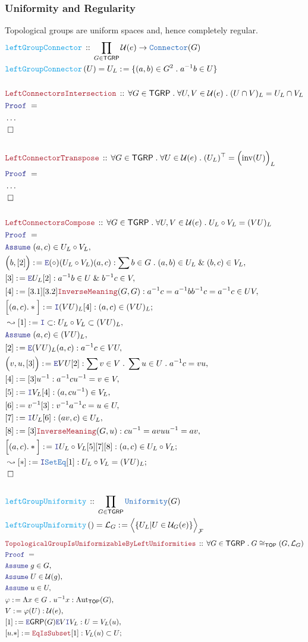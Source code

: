 \documentclass[12pt]{scrartcl}
\newcommand{\TYPE}[1]{\textcolor{NavyBlue}{\mathtt{#1}}}
\newcommand{\FUNC}[1]{\textcolor{Cerulean}{\mathtt{#1}}}
\newcommand{\LOGIC}[1]{\textcolor{Blue}{\mathtt{#1}}}
\newcommand{\THM}[1]{\textcolor{Maroon}{\mathtt{#1}}}
\renewcommand{\.}{\; . \;}
\newcommand{\de}{: \kern 0.1pc =}
\newcommand{\Act}[1]{\left( #1 \right)}
\newcommand{\Theorem}[2]{& \THM{#1} \, :: \, #2 \\ & \Proof = \\ }
\newcommand{\DeclareFunc}[2]{& \FUNC{#1} \, :: \, #2 \\}
\newcommand{\DefineNamedFunc}[4]{&  \FUNC{#1}\Act{#2} = #3 \de #4 \\}
\newcommand{\Page}[1]{ \begin{align*} #1 \end{align*}   }
\newcommand{\NoProof}{ & \ldots \\ \EndProof}
\renewcommand{\And}{\; \& \;}
\newcommand{\Aut}{\mathrm{Aut}}
\newcommand{\Say}[3]{& #1 \de #2 : #3, \\}
\newcommand{\Conclude}[3]{& #1 \de #2 : #3; \\}
\newcommand{\Derive}[3]{& \leadsto #1 \de #2 : #3, \\}
\newcommand{\DeriveConclude}[3]{& \leadsto #1 \de #2 : #3 ; \\}
\newcommand{\AssumeIn}[2]{& \LOGIC{Assume} \; #1 \in #2, \\}
\newcommand{\Intro}{\LOGIC{I}}
\newcommand{\Elim}{\LOGIC{E}}
\newcommand{\QED}{\; \square}
\newcommand{\EndProof}{& \QED \\}
\newcommand{\Proof}{\LOGIC{Proof} \; }
\newcommand{\TOP}{\mathsf{TOP}}
\renewcommand{\U}{\mathcal{U}}
\newcommand{\F}{\mathcal{F}}
\renewcommand{\L}{\mathcal{L}}
\newcommand{\GRP}{\mathsf{GRP}}
\newcommand{\Connector}{\TYPE{Connector}}
\newcommand{\Unif}{\TYPE{Uniformity}}
\newcommand{\inv}{\mathrm{inv}}
\newcommand{\TGRP}{\mathsf{TGRP}}
\renewcommand{\L}{\mathcal{L}}
\begin{document}
\subsubsection{Uniformity and Regularity}
Topological groups are uniform spaces and, hence completely regular.
\Page{
	\DeclareFunc{leftGroupConnector}
	{
		\prod_{G \in \TGRP} 
		\U(e) \to \Connector(G) 	
	}
	\DefineNamedFunc{leftGroupConnector}{U}{U_L}
	{
		\{ (a,b) \in G^2 \. a^{-1}b \in U   \}
	}
	\\
	\Theorem{LeftConnectorsIntersection}
	{
		\forall G \in \TGRP \.
		\forall U,V \in \U(e) \.
		(U \cap V)_L = U_L \cap V_L
	}
	\NoProof
	\\
	\Theorem{LeftConnectorTranspose}
	{
		\forall G \in \TGRP \.
		\forall U \in \U(e) \.
		(U_L)^\top = \Big(\inv(U)\Big)_L
	}
	\NoProof
	\\
	\Theorem{LeftConnectorsCompose}
	{
		\forall G \in \TGRP \.
		\forall U,V \in \U(e) \.
		U_L \circ V_L = (VU)_L
	}
	\AssumeIn{(a,c)}{U_L \circ V_L}
	\Say{\Big(b,[2]\Big)}{\Elim (\circ) (U_L \circ V_L)(a,c) }
	{
		\sum b \in G \. (a,b) \in U_L \And (b,c) \in V_L
	}
	\Say{[3]}{\Elim U_L [2]}{a^{-1}b \in U \And b^{-1}c \in V}
	\Say{[4]}{[3.1][3.2]\THM{InverseMeaning}(G,G)}
	{
		a^{-1}c = a^{-1}bb^{-1}c = a^{-1}c \in UV
	}
	\Conclude{\Big[(a,c).*\Big]}{\Intro (VU)_L[4]}
	{
		(a,c) \in (VU)_L	
	}
	\Derive{[1]}{\Intro \subset}{ U_L \circ V_L \subset (VU)_L }
	\AssumeIn{(a,c)}{(VU)_L}
	\Say{[2]}{\Elim (VU)_L (a,c) }
	{
		a^{-1}c \in VU
	}
	\Say{\Big(v,u,[3]\Big)}{\Elim VU [2]}
	{
		\sum v \in V \. \sum u \in U \. a^{-1}c = vu
	}
	\Say{[4]}{[3]u^{-1}}{a^{-1}cu^{-1} = v \in V}
	\Say{[5]}{\Intro V_L [4]}{(a,cu^{-1}) \in V_L}
	\Say{[6]}{v^{-1}[3]}{v^{-1}a^{-1}c = u \in U}
	\Say{[7]}{\Intro U_L [6]}{(av,c) \in U_L}
	\Say{[8]}{[3]\THM{InverseMeaning}(G,u)}
	{
		cu^{-1} = avuu^{-1} = av
	}
	\Conclude{\Big[(a,c).*\Big]}{\Intro U_L \circ V_L [5][7][8]}
	{
		(a,c) \in  U_L \circ V_L
	}
	\DeriveConclude{[*]}{\Intro \TYPE{SetEq}[1]}
	{
		U_L \circ V_L = (VU)_L
	}	
	\EndProof
	\\
	\DeclareFunc{leftGroupUniformity}{\prod_{G \in \TGRP} \Unif(G)}
	\DefineNamedFunc{leftGroupUniformity}{}{\L_G}
	{
		\Big\langle\{U_L  | U \in \U_G(e) \}\Big\rangle_\F
	}
}\Page{
	\Theorem{TopologicalGroupIsUniformizableByLeftUniformities}
	{
		\forall G \in \TGRP \. G \cong_\TOP (G,\L_G)
	}
	\AssumeIn{g}{G}
	\AssumeIn{U}{\U(g)}
	\AssumeIn{u}{U}
	\Say{\varphi}{\Lambda x \in G \. u^{-1}x}{\Aut_\TOP(G)}
	\Say{V}{\varphi(U)}{\U(e)}
	\Say{[1]}{\Elim \GRP(G) \Elim V \Intro V_L}{U = V_L(u)}
	\Conclude{[u.*]}{\THM{EqIsSubset}[1]}{V_L(u) \subset U}
}
\end{document}
